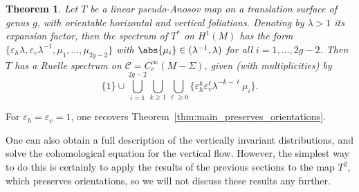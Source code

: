\documentclass[11pt, a4paper, oneside, final, pagebackref]{amsart}
\newcommand{\boC}{\mathcal{C}}
\renewcommand{\epsilon}{\varepsilon}
\renewcommand{\geq}{\geqslant}
\newtheorem{thm}{Theorem}[section]
\theoremstyle{definition}
\numberwithin{equation}{section}
\begin{document}
\begin{thm}
\label{thm:orientable_not_preserved_foliations} Let $T$ be a linear
pseudo-Anosov map on a translation surface of genus $g$, with orientable
horizontal and vertical foliations. Denoting by $\lambda
> 1$ its expansion factor, then the spectrum of $T^*$ on $H^1(M)$ has the
form $\{\epsilon_h \lambda, \epsilon_v
\lambda^{-1},\mu_1,\dotsc,\mu_{2g-2}\}$ with $\abs{\mu_i} \in
(\lambda^{-1},\lambda)$ for all $i=1,\dotsc, 2g-2$. Then $T$ has a Ruelle
spectrum on $\boC = C^\infty_c(M-\Sigma)$, given (with multiplicities) by
\begin{equation*}
  \{1\} \cup \bigcup_{i=1}^{2g-2} \bigcup_{k \geq 1} \bigcup_{\ell \geq 0} \{\epsilon_h^k \epsilon_v^\ell \lambda^{-k-\ell}\mu_i\}.
\end{equation*}
\end{thm}
For $\epsilon_h=\epsilon_v=1$, one recovers
Theorem~\ref{thm:main_preserves_orientations}.

One can also obtain a full description of the vertically invariant
distributions, and solve the cohomological equation for the vertical flow.
However, the simplest way to do this is certainly to apply the results of the
previous sections to the map $T^2$, which preserves orientations, so we will
not discuss these results any further.
\end{document}
